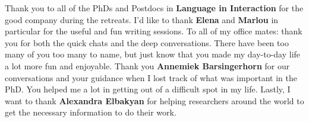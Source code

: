 Thank you to all of the PhDs and Postdocs in \textbf{Language in Interaction} for the good company during the retreats. I'd like to thank \textbf{Elena} and \textbf{Marlou} in particular for the useful and fun writing sessions. \newline
To all of my office mates: thank you for both the quick chats and the deep conversations. There have been too many of you too many to name, but just know that you made my day-to-day life a lot more fun and enjoyable. \newline
Thank you \textbf{Annemiek Barsingerhorn} for our conversations and your guidance when I lost track of what was important in the PhD. You helped me a lot in getting out of a difficult spot in my life. \newline
Lastly, I want to thank \textbf{Alexandra Elbakyan} for helping researchers around the world to get the necessary information to do their work. 






